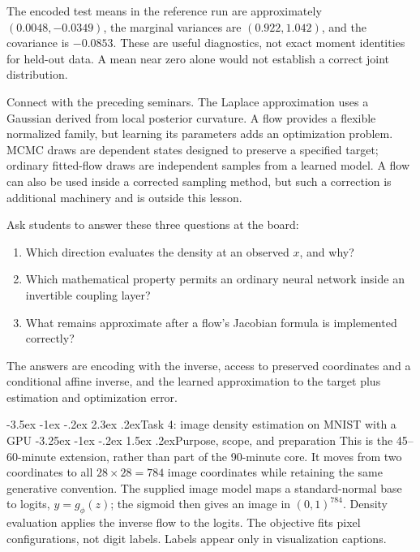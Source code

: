 \documentclass[11pt,a4paper]{article}
\makeatletter
\renewcommand\section{\@startsection{section}{1}{\z@}%
  {-3.5ex \@plus -1ex \@minus -.2ex}%
  {2.3ex \@plus .2ex}{\normalfont\Large}}
\renewcommand\subsection{\@startsection{subsection}{2}{\z@}%
  {-3.25ex \@plus -1ex \@minus -.2ex}%
  {1.5ex \@plus .2ex}{\normalfont\large}}
\makeatother
\begin{document}
The encoded test means in the reference run are approximately $(0.0048,-0.0349)$,
the marginal variances are $(0.922,1.042)$, and the covariance is $-0.0853$.
These are useful diagnostics, not exact moment identities for held-out data.
A mean near zero alone would not establish a correct joint distribution.

Connect with the preceding seminars. The Laplace approximation uses a
Gaussian derived from local posterior curvature. A flow provides a flexible
normalized family, but learning its parameters adds an optimization problem.
MCMC draws are dependent states designed to preserve a specified target;
ordinary fitted-flow draws are independent samples from a learned model.
A flow can also be used inside a corrected sampling method, but such a
correction is additional machinery and is outside this lesson.

Ask students to answer these three questions at the board:
\begin{enumerate}
\item Which direction evaluates the density at an observed $x$, and why?
\item Which mathematical property permits an ordinary neural network inside
an invertible coupling layer?
\item What remains approximate after a flow's Jacobian formula is implemented
correctly?
\end{enumerate}
The answers are encoding with the inverse, access to preserved coordinates
and a conditional affine inverse, and the learned approximation to the target
plus estimation and optimization error.

\section{Task 4: image density estimation on MNIST with a GPU}
\subsection{Purpose, scope, and preparation}
This is the 45--60-minute extension, rather than part of the 90-minute core.
It moves from two coordinates to all $28\times28=784$ image coordinates while
retaining the same generative convention. The supplied image model maps a
standard-normal base to logits, $y=g_\phi(z)$; the sigmoid then gives an image
in $(0,1)^{784}$. Density evaluation applies the inverse flow to the logits.
The objective fits pixel configurations, not digit labels. Labels appear only
in visualization captions.
\end{document}
